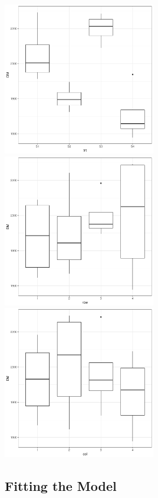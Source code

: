 \documentclass[a4paper, 10pt, fleqn, twosided]{memoir}
\begin{document}
\begin{tcolorbox}[title = Example 4 Boxplots]
\includegraphics[width=0.5\textwidth, frame]{Example4trt_boxplot.pdf}
\includegraphics[width=0.5\textwidth, frame]{Example4row_boxplot.pdf}
\includegraphics[width=0.5\textwidth, frame]{Example4col_boxplot.pdf}
\end{tcolorbox}


\subsection{Fitting the Model}
\end{document}
